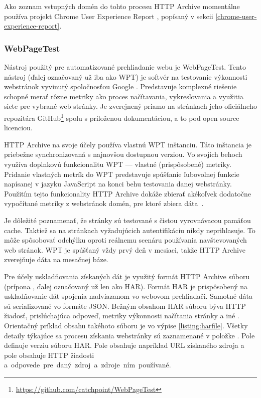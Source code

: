 Ako zoznam vstupných domén do tohto procesu HTTP Archive momentálne používa projekt Chrome User Experience Report \cite{httparchive-faq}, popísaný v sekcii \ref{chrome-user-experience-report}.

\subsubsection{WebPageTest}

Nástroj použitý pre automatizované prehliadanie webu je WebPageTest. Tento nástroj (ďalej označovaný už iba ako WPT) je softvér na testovanie výkonnosti webstránok vyvinutý spoločnosťou Google \cite{webpagetest}. 
Predstavuje komplexné riešenie schopné merať rôzne metriky ako proces načítavania, vykresľovania a využitia siete pre vybrané web stránky. 
Je zverejnený priamo na stránkach jeho oficiálneho repozitára GitHub\footnote{\href{https://github.com/catchpoint/WebPageTest}{https://github.com/catchpoint/WebPageTest}} spolu s priloženou dokumentáciou, a to pod open source licenciou.

HTTP Archive na svoje účely používa vlastnú WPT inštanciu. 
Táto inštancia je priebežne synchronizovaná s najnovšou dostupnou verziou.
Vo svojich behoch využíva doplnkovú funkcionalitu WPT --- vlastné (prispôsobené) metriky.
Pridanie vlastných metrík do WPT predstavuje spúšťanie ľubovolnej funkcie napísanej v jazyku JavaScript na konci behu testovania danej webstránky. 
Použitím tejto funkcionality HTTP Archive dokáže zbierať akékoľvek dodatočne vypočítané metriky z webstránok domén, pre ktoré zbiera \mbox{dáta \cite{webpagetest}}.

Je dôležité poznamenať, že stránky sú testované s čistou vyrovnávacou pamäťou cache. 
Taktiež sa na stránkach vyžadujúcich autentifikáciu nikdy neprihlasuje.
To môže spôsobovať odchýlku oproti reálnemu scenáru používania navštevovaných web stránok. 
WPT je spúšťaný vždy prvý deň v mesiaci, takže HTTP Archive zverejňuje dáta na mesačnej báze.

Pre účely uskladňovania získaných dát je využitý formát HTTP Archive súboru (prípona , ďalej označovaný už len ako HAR).
Formát HAR je prispôsobený na uskladňovanie dát spojenia nadviazanom vo webovom prehliadači. Samotné dáta sú serializované vo formáte JSON.
Bežným obsahom HAR súboru býva HTTP žiadosť, prislúchajúca odpoveď, metriky výkonnosti načítania stránky a iné \cite{httparchive-harfile}. 
Orientačný príklad obsahu takéhoto súboru je vo výpise \ref{listing:harfile}.
Všetky detaily týkajúce sa procesu získania webstránky sú zaznamenané v položke . Pole  definuje verziu súboru HAR. Pole  obsahuje napríklad URL získaného zdroja a pole  obsahuje HTTP žiadosti \mbox{a odpovede pre daný zdroj a zdroje ním používané.}

